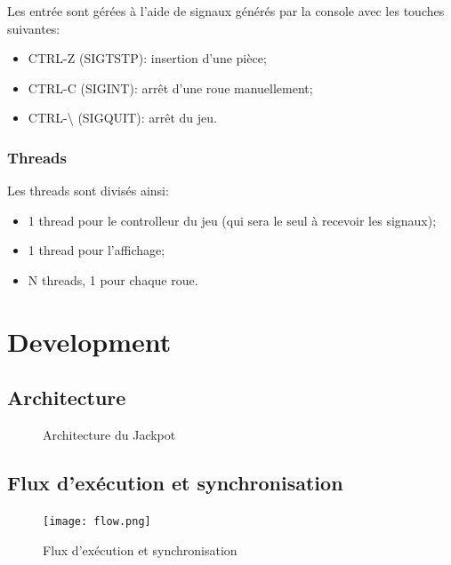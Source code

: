 \documentclass[11pt, a4paper]{article}
\begin{document}
Les entrée sont gérées à l'aide de signaux générés par la console avec les touches suivantes:
\begin{itemize}
    \item CTRL-Z (SIGTSTP): insertion d'une pièce;
    \item CTRL-C (SIGINT): arrêt d'une roue manuellement;
    \item CTRL-\textbackslash{} (SIGQUIT): arrêt du jeu.
\end{itemize}

\subsubsection{Threads}

Les threads sont divisés ainsi:
\begin{itemize}
    \item 1 thread pour le controlleur du jeu (qui sera le seul à recevoir les signaux);
    \item 1 thread pour l'affichage;
    \item N threads, 1 pour chaque roue.
\end{itemize}

\newpage

\section{Development}
\subsection{Architecture}

\begin{figure}[H]
    \begin{center}
    \end{center}
    \caption{Architecture du Jackpot}
    \label{Architecture du Jackpot}
\end{figure}

\newpage

\subsection{Flux d'exécution et synchronisation}

\begin{figure}[H]
    \begin{center}
        \texttt{[image: flow.png]}
    \end{center}
    \caption{Flux d'exécution et synchronisation}
    \label{Flux d'exécution et synchronisation}
\end{figure}
\end{document}
